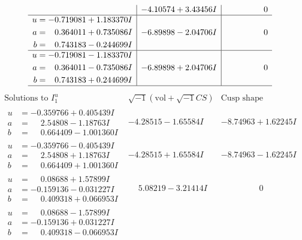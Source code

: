 \documentclass[1p]{elsarticle_modified}
\theoremstyle{definition}
\newcommand{\I}{\sqrt{-1}}
\begin{document}
$$\begin{array}{c|c|c}
 & -4.10574 + 3.43456 I & \phantom{-0.000000 } 0 \\ \hline\begin{aligned}
u &= -0.719081 + 1.183370 I \\
a &= \phantom{-}0.364011 + 0.735086 I \\
b &= \phantom{-}0.743183 - 0.244699 I\end{aligned}
 & -6.89898 - 2.04706 I & \phantom{-0.000000 } 0 \\ \hline\begin{aligned}
u &= -0.719081 - 1.183370 I \\
a &= \phantom{-}0.364011 - 0.735086 I \\
b &= \phantom{-}0.743183 + 0.244699 I\end{aligned}
 & -6.89898 + 2.04706 I & \phantom{-0.000000 } 0\\
 \hline 
 \end{array}$$\newpage$$\begin{array}{c|c|c}  
\text{Solutions to }I^u_{1}& \I (\text{vol} + \sqrt{-1}CS) & \text{Cusp shape}\\
 \hline 
\begin{aligned}
u &= -0.359766 + 0.405439 I \\
a &= \phantom{-}2.54808 - 1.18763 I \\
b &= \phantom{-}0.664409 - 1.001360 I\end{aligned}
 & -4.28515 - 1.65584 I & -8.74963 + 1.62245 I \\ \hline\begin{aligned}
u &= -0.359766 - 0.405439 I \\
a &= \phantom{-}2.54808 + 1.18763 I \\
b &= \phantom{-}0.664409 + 1.001360 I\end{aligned}
 & -4.28515 + 1.65584 I & -8.74963 - 1.62245 I \\ \hline\begin{aligned}
u &= \phantom{-}0.08688 + 1.57899 I \\
a &= -0.159136 - 0.031227 I \\
b &= \phantom{-}0.409318 + 0.066953 I\end{aligned}
 & \phantom{-}5.08219 - 3.21414 I & \phantom{-0.000000 } 0 \\ \hline\begin{aligned}
u &= \phantom{-}0.08688 - 1.57899 I \\
a &= -0.159136 + 0.031227 I \\
b &= \phantom{-}0.409318 - 0.066953 I\end{aligned}

\end{array}$$
\end{document}
